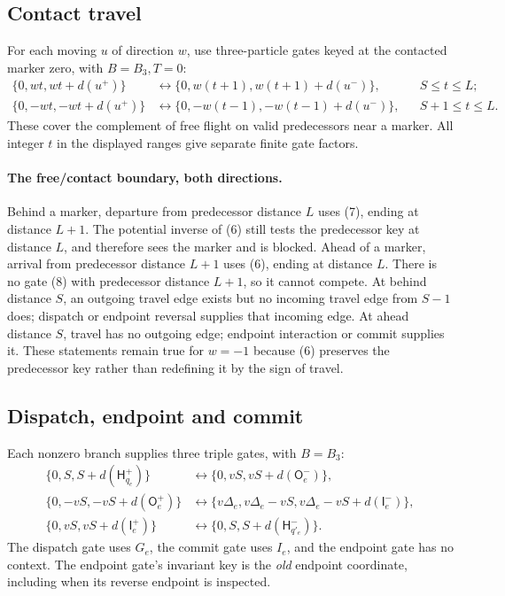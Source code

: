 \documentclass[11pt,a4paper]{article}
\numberwithin{equation}{section}
\newcommand{\Hh}{\mathsf H}\newcommand{\Oo}{\mathsf O}\newcommand{\Ii}{\mathsf I}\newcommand{\HH}{\mathsf H}
\begin{document}
\subsection{Contact travel}
For each moving $u$ of direction $w$, use three-particle gates keyed at the
contacted marker zero, with $B=B_3,T=0$:
\begin{align}
 \{0,wt,wt+d(u^+)\}&\longleftrightarrow
 \{0,w(t+1),w(t+1)+d(u^-)\}, && S\le t\le L; \tag{7}\label{fpa:eq:behind}\\
 \{0,-wt,-wt+d(u^+)\}&\longleftrightarrow
 \{0,-w(t-1),-w(t-1)+d(u^-)\}, && S+1\le t\le L. \tag{8}\label{fpa:eq:ahead}
\end{align}
These cover the complement of free flight on valid predecessors near a marker.
All integer $t$ in the displayed ranges give separate finite gate factors.

\paragraph{The free/contact boundary, both directions.}
Behind a marker, departure from predecessor distance $L$ uses (7), ending
at distance $L+1$. The potential inverse of (6) still tests the predecessor
key at distance $L$, and therefore sees the marker and is blocked. Ahead of
a marker, arrival from predecessor distance $L+1$ uses (6), ending at distance
$L$. There is no gate (8) with predecessor distance $L+1$, so it cannot compete.
At behind distance $S$, an outgoing travel edge exists but no incoming travel
edge from $S-1$ does; dispatch or endpoint reversal supplies that incoming
edge. At ahead distance $S$, travel has no outgoing edge; endpoint interaction
or commit supplies it. These statements remain true for $w=-1$ because (6)
preserves the predecessor key rather than redefining it by the sign of travel.

\subsection{Dispatch, endpoint and commit}
Each nonzero branch supplies three triple gates, with $B=B_3$:
\begin{align}
 \{0,S,S+d(\Hh_{q_e}^+)\}
 &\longleftrightarrow\{0,vS,vS+d(\Oo_e^-)\},          \tag{9}\label{fpa:eq:dispatch}\\
 \{0,-vS,-vS+d(\Oo_e^+)\}
 &\longleftrightarrow\{v\Delta_e,v\Delta_e-vS,
 v\Delta_e-vS+d(\Ii_e^-)\},                           \tag{10}\label{fpa:eq:endpoint}\\
 \{0,vS,vS+d(\Ii_e^+)\}
 &\longleftrightarrow\{0,S,S+d(\Hh_{q'_e}^-)\}.       \tag{11}\label{fpa:eq:commit}
\end{align}
The dispatch gate uses $G_e$, the commit gate uses $I_e$, and the endpoint gate
has no context. The endpoint gate's invariant key is the \emph{old} endpoint
coordinate, including when its reverse endpoint is inspected.
\end{document}
